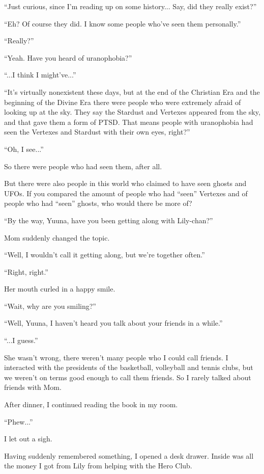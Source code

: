 ``Just curious, since I'm reading up on some history... Say, did they really exist?''

``Eh? Of course they did. I know some people who've seen them personally.''

``Really?''

``Yeah. Have you heard of uranophobia?''

``...I think I might've...''

``It's virtually nonexistent these days, but at the end of the Christian Era and the beginning of the Divine Era there were people who were extremely afraid of looking up at the sky. They say the Stardust and Vertexes appeared from the sky, and that gave them a form of PTSD. That means people with uranophobia had seen the Vertexes and Stardust with their own eyes, right?''

``Oh, I see...''

So there were people who had seen them, after all.

But there were also people in this world who claimed to have seen ghosts and UFOs. If you compared the amount of people who had ``seen'' Vertexes and of people who had ``seen'' ghosts, who would there be more of?

``By the way, Yuuna, have you been getting along with Lily-chan?''

Mom suddenly changed the topic.

``Well, I wouldn't call it getting along, but we're together often.''

``Right, right.''

Her mouth curled in a happy smile.

``Wait, why are you smiling?''

``Well, Yuuna, I haven't heard you talk about your friends in a while.''

``...I guess.''

She wasn't wrong, there weren't many people who I could call friends. I interacted with the presidents of the basketball, volleyball and tennis clubs, but we weren't on terms good enough to call them friends. So I rarely talked about friends with Mom.

After dinner, I continued reading the book in my room.

``Phew...''

I let out a sigh.

Having suddenly remembered something, I opened a desk drawer. Inside was all the money I got from Lily from helping with the Hero Club.

